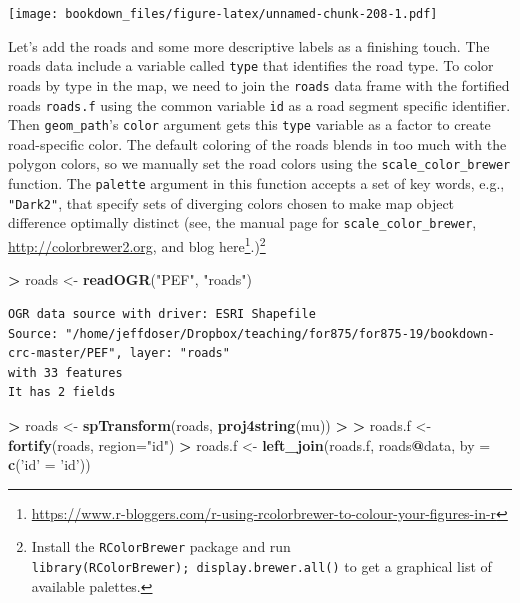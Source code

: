 \documentclass[]{krantz}
\makeatletter
\newenvironment{Shaded}{\begin{snugshade}}{\end{snugshade}}
\newcommand{\KeywordTok}[1]{\textcolor[rgb]{0.27,0.27,0.27}{\textbf{#1}}}
\newcommand{\DataTypeTok}[1]{\textcolor[rgb]{0.27,0.27,0.27}{#1}}
\newcommand{\StringTok}[1]{\textcolor[rgb]{0.5,0.5,0.5}{#1}}
\newcommand{\OperatorTok}[1]{\textcolor[rgb]{0.43,0.43,0.43}{\textbf{#1}}}
\newcommand{\ErrorTok}[1]{\textcolor[rgb]{0.14,0.14,0.14}{\textbf{#1}}}
\newcommand{\NormalTok}[1]{#1}
\renewcommand{\href}[2]{#2\footnote{\url{#1}}}
\newenvironment{kframe}{%
\medskip{}
\setlength{\fboxsep}{.8em}
 \def\at@end@of@kframe{}%
 \ifinner\ifhmode%
  \def\at@end@of@kframe{\end{minipage}}%
  \begin{minipage}{\columnwidth}%
 \fi\fi%
 \def\FrameCommand##1{\hskip\@totalleftmargin \hskip-\fboxsep
 \colorbox{shadecolor}{##1}\hskip-\fboxsep
     \hskip-\linewidth \hskip-\@totalleftmargin \hskip\columnwidth}%
 \MakeFramed {\advance\hsize-\width
   \@totalleftmargin\z@ \linewidth\hsize
   \@setminipage}}%
 {\par\unskip\endMakeFramed%
 \at@end@of@kframe}
\renewenvironment{Shaded}{\begin{kframe}}{\end{kframe}}
\makeatother
\begin{document}
\texttt{[image: bookdown\_files/figure-latex/unnamed-chunk-208-1.pdf]}

Let's add the roads and some more descriptive labels as a finishing
touch. The roads data include a variable called \texttt{type} that
identifies the road type. To color roads by type in the map, we need to
join the \texttt{roads} data frame with the fortified roads
\texttt{roads.f} using the common variable \texttt{id} as a road segment
specific identifier. Then \texttt{geom\_path}'s \texttt{color} argument
gets this \texttt{type} variable as a factor to create road-specific
color. The default coloring of the roads blends in too much with the
polygon colors, so we manually set the road colors using the
\texttt{scale\_color\_brewer} function. The \texttt{palette} argument in
this function accepts a set of key words, e.g., \texttt{"Dark2"}, that
specify sets of diverging colors chosen to make map object difference
optimally distinct (see, the manual page for
\texttt{scale\_color\_brewer}, \url{http://colorbrewer2.org}, and blog
\href{https://www.r-bloggers.com/r-using-rcolorbrewer-to-colour-your-figures-in-r}{here}.)\footnote{Install
  the \texttt{RColorBrewer} package and run
  \texttt{library(RColorBrewer);\ display.brewer.all()} to get a
  graphical list of available palettes.}

\begin{Shaded}
\begin{Highlighting}[]
\OperatorTok{>}\StringTok{ }\NormalTok{roads <-}\StringTok{ }\KeywordTok{readOGR}\NormalTok{(}\StringTok{"PEF"}\NormalTok{, }\StringTok{"roads"}\NormalTok{)}
\end{Highlighting}
\end{Shaded}

\begin{verbatim}
OGR data source with driver: ESRI Shapefile 
Source: "/home/jeffdoser/Dropbox/teaching/for875/for875-19/bookdown-crc-master/PEF", layer: "roads"
with 33 features
It has 2 fields
\end{verbatim}

\begin{Shaded}
\begin{Highlighting}[]
\OperatorTok{>}\StringTok{ }\NormalTok{roads <-}\StringTok{ }\KeywordTok{spTransform}\NormalTok{(roads, }\KeywordTok{proj4string}\NormalTok{(mu))}
\OperatorTok{>}\StringTok{ }
\ErrorTok{>}\StringTok{ }\NormalTok{roads.f <-}\StringTok{ }\KeywordTok{fortify}\NormalTok{(roads, }\DataTypeTok{region=}\StringTok{"id"}\NormalTok{)}
\OperatorTok{>}\StringTok{ }\NormalTok{roads.f <-}\StringTok{ }\KeywordTok{left_join}\NormalTok{(roads.f, roads}\OperatorTok{@}\NormalTok{data, }\DataTypeTok{by =} \KeywordTok{c}\NormalTok{(}\StringTok{'id'}\NormalTok{ =}\StringTok{ 'id'}\NormalTok{))}
\end{Highlighting}
\end{Shaded}
\end{document}
